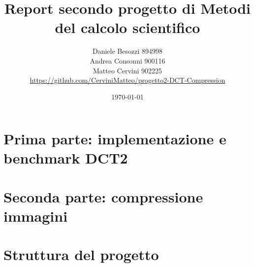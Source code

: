 \documentclass{report}
\title{Report secondo progetto di Metodi del calcolo scientifico}
\author{
Daniele Besozzi 894998 \\
Andrea Consonni 900116 \\
Matteo Cervini 902225 \\
\url{https://github.com/CerviniMatteo/progetto2-DCT-Compression}
}
\date{\today}
\begin{document}
    \maketitle

    \tableofcontents
    \chapter{Prima parte: implementazione e benchmark DCT2}
    
    \chapter{Seconda parte: compressione immagini}
    
    \chapter{Struttura del progetto}
    
    \printbibliography
\end{document}
